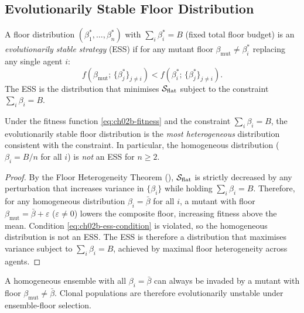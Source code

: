 \subsection{Evolutionarily Stable Floor Distribution}

\begin{definition}
\label{def:ch02b-ess}
A floor distribution $(\beta_1^*, \ldots, \beta_n^*)$ with
$\sum_i \beta_i^* = B$ (fixed total floor budget) is an
\emph{evolutionarily stable strategy} (ESS) if for any mutant floor
$\beta_{\mathrm{mut}} \neq \beta_i^*$ replacing any single agent $i$:
\begin{equation}
  f\!\left(\beta_{\mathrm{mut}};\, \{\beta_j^*\}_{j \neq i}\right)
  < f\!\left(\beta_i^*;\, \{\beta_j^*\}_{j \neq i}\right).
  \label{eq:ch02b-ess-condition}
\end{equation}
The ESS is the distribution that minimises $\mathcal{S}_{\mathrm{flat}}$ subject
to the constraint $\sum_i \beta_i = B$.
\end{definition}

\begin{theorem}
\label{thm:ch02b-ess-heterogeneity}
Under the fitness function \eqref{eq:ch02b-fitness} and the constraint
$\sum_i \beta_i = B$, the evolutionarily stable floor distribution is the
\emph{most heterogeneous} distribution consistent with the constraint.
In particular, the homogeneous distribution ($\beta_i = B/n$ for all $i$)
is \emph{not} an ESS for $n \geq 2$.
\end{theorem}

\begin{proof}
By the Floor Heterogeneity Theorem (),
$\mathcal{S}_{\mathrm{flat}}$ is strictly decreased by any perturbation that
increases variance in $\{\beta_i\}$ while holding $\sum_i \beta_i = B$.
Therefore, for any homogeneous distribution $\beta_i = \bar\beta$ for all $i$,
a mutant with floor $\beta_{\mathrm{mut}} = \bar\beta + \varepsilon$
($\varepsilon \neq 0$) lowers the composite floor, increasing fitness above
the mean.  Condition \eqref{eq:ch02b-ess-condition} is violated, so the
homogeneous distribution is not an ESS.  The ESS is therefore a distribution
that maximises variance subject to $\sum_i \beta_i = B$, achieved by maximal
floor heterogeneity across agents.
\end{proof}

\begin{corollary}
\label{cor:ch02b-invasion}
A homogeneous ensemble with all $\beta_i = \bar\beta$ can always be invaded
by a mutant with floor $\beta_{\mathrm{mut}} \neq \bar\beta$.  Clonal
populations are therefore evolutionarily unstable under ensemble-floor
selection.
\end{corollary}

